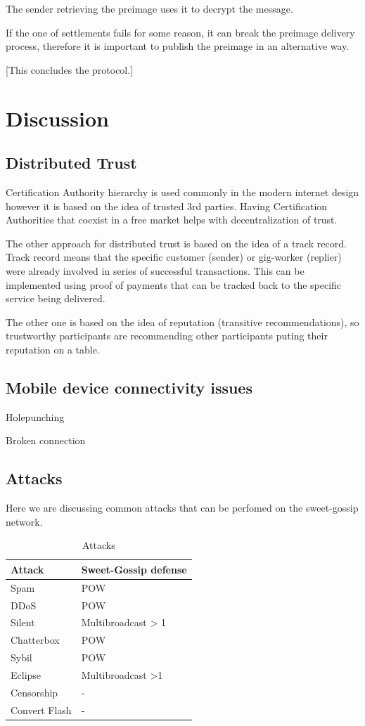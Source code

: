 \documentclass{article}
\begin{document}
The sender retrieving the preimage uses it to decrypt the message.

If the one of settlements fails for some reason, it can break the preimage delivery process, therefore it is important to publish the preimage in an alternative way.

[This concludes the protocol.]

\section{Discussion}

\subsection{Distributed Trust}

Certification Authority hierarchy is used commonly in the modern internet design however it is based on the idea of trusted 3rd parties. Having Certification Authorities that coexist in a free market helps with decentralization of trust.

The other approach for distributed trust is based on the idea of a track record. Track record means that the specific customer (sender) or gig-worker (replier) were already involved in series of successful transactions. This can be implemented using proof of payments that can be tracked back to the specific service being delivered.

The other one is based on the idea of reputation (transitive recommendations), so trustworthy participants are recommending other participants puting their reputation on a table.

\subsection{Mobile device connectivity issues}


Holepunching \cite{HolePunching}

Broken connection

\subsection{Attacks}
Here we are discussing common attacks that can be perfomed on the sweet-gossip network.


\begin{table}  
	\centering
	\begin{tabular}{ll}
		\toprule
		Attack         & Sweet-Gossip defense \\
		\midrule
		Spam           & POW \\
		DDoS           & POW \\
		Silent         & Multibroadcast > 1 \\
		Chatterbox     & POW \\
		Sybil          & POW \\
		Eclipse        & Multibroadcast >1 \\
		Censorship     & - \\
		Convert Flash  & - \\
		\bottomrule
	\end{tabular}
	\label{tab:attacks}
	\caption{Attacks}
\end{table}
\end{document}
